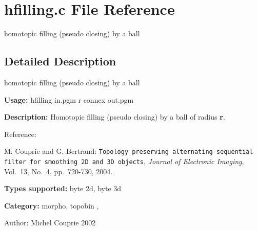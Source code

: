 \section{hfilling.c File Reference}
\label{hfilling_8c}
homotopic filling (pseudo closing) by a ball  




\label{_details}
\subsection{Detailed Description}
homotopic filling (pseudo closing) by a ball 

{\bf Usage:} hfilling in.pgm r connex out.pgm

{\bf Description:} Homotopic filling (pseudo closing) by a ball of radius {\bf r}.

Reference:\par
 [CB04] M. Couprie and G. Bertrand: {\tt Topology preserving alternating sequential filter for smoothing 2D and 3D objects}, {\em  Journal of Electronic Imaging\/}, Vol.~13, No.~4, pp.~720-730, 2004.

{\bf Types supported:} byte 2d, byte 3d

{\bf Category:} morpho, topobin ,

\begin{Desc}
\item[Author:]Michel Couprie 2002 \end{Desc}

